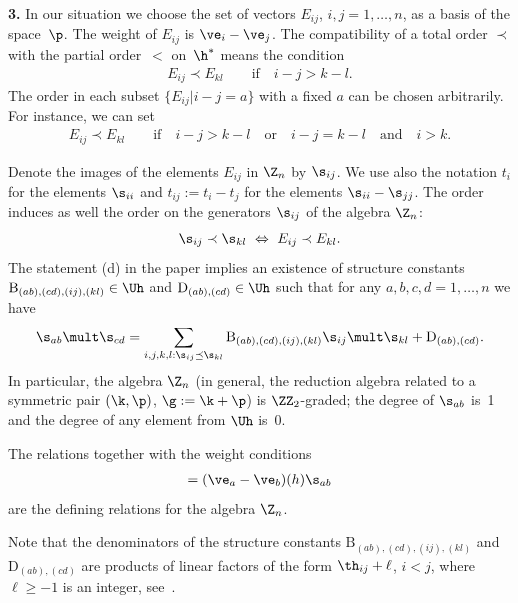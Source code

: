 {\bf 3.} In our situation we choose the set of vectors $E_{ij}$, $i,j=1,\dots ,n$, as a basis of the space~$\p$. The weight of $E_{ij}$ is $\ve_i-\ve_j$.
The compatibility of a total order $\prec$ with the partial order~$<$ on~$\h^*$ means the condition
\begin{gather*}%
E_{ij}\prec E_{kl}\qquad \text{if}\quad i-j>k-l .
\end{gather*}
The order in each subset $\{E_{ij}|i-j=a\}$ with a f\/ixed $a$ can be chosen arbitrarily. For instance, we can set
\begin{gather}\label{not4}
E_{ij}\prec E_{kl}\qquad \text{if}\quad i-j>k-l\quad\text{or}\quad i-j=k-l\quad\text{and}\quad i>k .
\end{gather}

Denote the images of the elements $E_{ij}$ in $\Z_n$ by $\s_{ij}$. We use also the notation $t_i$ for the elements $\s_{ii}$ and $t_{ij}:=t_i-t_j$ for the elements
$\s_{ii}-\s_{jj}$. The order  induces as well the order on the generators $\s_{ij}$ of the algebra $\Z_n$:
\begin{gather*} %
\s_{ij}\prec\s_{kl}\ \Leftrightarrow\ E_{ij}\prec E_{kl}  .
\end{gather*}
The  statement (d) in the paper \cite[Section~2]{KO3} implies an existence of structure constants $\mathrm{B}_{(ab),(cd),(ij),(kl)} \in \Uh$ and $\mathrm{D}_{(ab),(cd)}\in\Uh$
such that for any $a,b,c,d=1,\ldots,n$ we have
\begin{gather}\label{not6}
\s_{ab}\mult\s_{cd}=\sum_{i,j,k,l:\s_{ij}\preceq\s_{kl}}\mathrm{B}_{(ab),(cd),(ij),(kl)}\s_{ij}\mult\s_{kl}+\mathrm{D}_{(ab),(cd)}  .
\end{gather}
In particular, the algebra $\Z_n$ (in general, the reduction algebra related to a symmetric pair $(\k,\p)$, $\g :=\k +\p$) is $\ZZ_2$-graded; the degree of $\s_{ab}$ is~1 and the degree of any element from $\Uh$ is~0.


The relations  together with the weight conditions
\begin{gather*}
 [h,\s_{ab}]=(\ve_a-\ve_b)(h) \s_{ab}%
\end{gather*}
are the def\/ining relations for the algebra $\Z_n$.


Note that the denominators of the structure constants $\mathrm{B}_{(ab),(cd),(ij),(kl)}$ and
 $\mathrm{D}_{(ab),(cd)}$ are pro\-ducts
of linear factors of the form $\th_{ij}+\ell$, $i<j$, where $\ell\geq -1$ is an integer, see~\cite{KO3}.


